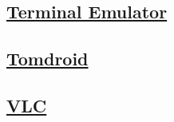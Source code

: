 \subsection{\href{https://f-droid.org/repository/browse/?fdcategory=System&fdid=jackpal.androidterm&fdpage=9}
{Terminal Emulator}}

\subsection{\href{https://f-droid.org/repository/browse/?fdcategory=Office&fdid=org.tomdroid&fdpage=11}
{Tomdroid}}

\subsection{\href{https://f-droid.org/repository/browse/?fdcategory=Multimedia&fdid=org.videolan.vlc&fdpage=6}
{VLC}}

